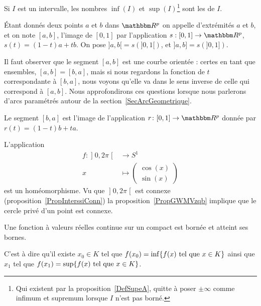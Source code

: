 Si \( I\) est un intervalle, les nombres \( \inf(I)\) et \( \sup(I)\)\footnote{Qui existent par la proposition~\ref{DefSupeA}, quitte à poser \( \pm\infty\) comme infimum et supremum lorsque \( I\) n'est pas borné.} sont les  de \( I\).

\begin{definition}      \label{DefLISOooDHLQrl}
	Étant donnés deux points $a$ et $b$ dans $\eR^p$ on appelle  d'extrémités $a$ et $b$, et on note $[a,b]$, l'image de $[0,1]$ par l'application $s: [0,1]\to \eR^p$, $s(t)= (1-t)a+tb$.  On pose $]a,b[=s\left(]0,1[\right)$, et  $]a,b]=s\left(]0,1]\right)$.
\end{definition}
Il faut observer que le segment $[a,b]$ est une courbe orientée : certes en tant que ensembles, $[a,b]=[b,a]$, mais si nous regardons la fonction de $t$ correspondante à $[b,a]$, nous voyons qu'elle va dans le sens inverse de celle qui correspond à $[a,b]$. Nous approfondirons ces questions lorsque nous parlerons d'arcs paramétrés autour de la section~\ref{SecArcGeometrique}.

Le segment $[b,a]$ est l'image de l'application $r\colon [0,1]\to \eR^p$ donnée par $r(t)=(1-t)b+ta$.

\begin{example} \label{EXooJFDPooBZADKs}
    L'application
    \begin{equation}
        \begin{aligned}
            f\colon \mathopen] 0 , 2\pi \mathclose[&\to S^1 \\
                x&\mapsto \begin{pmatrix}
                    \cos(x)    \\
                    \sin(x)
                \end{pmatrix}
        \end{aligned}
    \end{equation}
    est un homéomorphisme. Vu que \( \mathopen] 0 , 2\pi \mathclose[\) est connexe (proposition~\ref{PropInterssiConn}) la proposition~\ref{PropGWMVzqb} implique que le cercle privé d'un point est connexe.
\end{example}

\begin{theorem}\label{ThoMKKooAbHaro}
    Une fonction à valeurs réelles continue sur un compact est bornée et atteint ses bornes.

	C'est à dire qu'il existe $x_0\in K$ tel que $f(x_0)=\inf\{ f(x)\text{ tel que } x\in K \}$ ainsi que $x_1$ tel que $f(x_1)=\sup\{ f(x)\text{ tel que } x\in K \}$.
\end{theorem}

